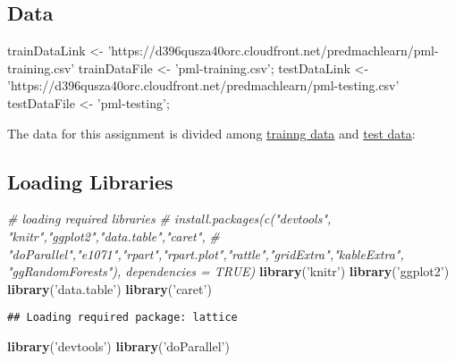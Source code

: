 \documentclass[]{article}
\newenvironment{Shaded}{\begin{snugshade}}{\end{snugshade}}
\newcommand{\KeywordTok}[1]{\textcolor[rgb]{0.13,0.29,0.53}{\textbf{#1}}}
\newcommand{\StringTok}[1]{\textcolor[rgb]{0.31,0.60,0.02}{#1}}
\newcommand{\CommentTok}[1]{\textcolor[rgb]{0.56,0.35,0.01}{\textit{#1}}}
\newcommand{\NormalTok}[1]{#1}
\begin{document}
\subsection{Data}\label{data}

\begin{Shaded}
\begin{Highlighting}[]
\NormalTok{trainDataLink <-}\StringTok{ 'https://d396qusza40orc.cloudfront.net/predmachlearn/pml-training.csv'}
\NormalTok{trainDataFile <-}\StringTok{ 'pml-training.csv'}\NormalTok{;}
\NormalTok{testDataLink  <-}\StringTok{ 'https://d396qusza40orc.cloudfront.net/predmachlearn/pml-testing.csv'}
\NormalTok{testDataFile  <-}\StringTok{ 'pml-testing'}\NormalTok{;}
\end{Highlighting}
\end{Shaded}

The data for this assignment is divided among
\href{https://d396qusza40orc.cloudfront.net/predmachlearn/pml-training.csv}{trainng
data} and
\href{https://d396qusza40orc.cloudfront.net/predmachlearn/pml-testing.csv}{test
data}:

\subsection{Loading Libraries}\label{loading-libraries}

\begin{Shaded}
\begin{Highlighting}[]
\CommentTok{# loading required libraries}
\CommentTok{# install.packages(c("devtools", "knitr","ggplot2","data.table","caret",}
\CommentTok{#   "doParallel","e1071","rpart","rpart.plot","rattle","gridExtra","kableExtra", "ggRandomForests"), dependencies = TRUE)}
\KeywordTok{library}\NormalTok{(}\StringTok{'knitr'}\NormalTok{)}
\KeywordTok{library}\NormalTok{(}\StringTok{'ggplot2'}\NormalTok{)}
\KeywordTok{library}\NormalTok{(}\StringTok{'data.table'}\NormalTok{)}
\KeywordTok{library}\NormalTok{(}\StringTok{'caret'}\NormalTok{)}
\end{Highlighting}
\end{Shaded}

\begin{verbatim}
## Loading required package: lattice
\end{verbatim}

\begin{Shaded}
\begin{Highlighting}[]
\KeywordTok{library}\NormalTok{(}\StringTok{'devtools'}\NormalTok{)}
\KeywordTok{library}\NormalTok{(}\StringTok{'doParallel'}\NormalTok{) }
\end{Highlighting}
\end{Shaded}
\end{document}
